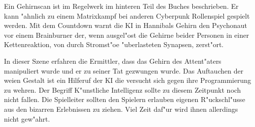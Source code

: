 \begin{remarks}
	Ein Gehirnscan ist im Regelwerk im hinteren Teil des Buches beschrieben. Er kann "ahnlich zu einem Matrixkampf bei anderen Cyberpunk Rollenspiel gespielt werden. Mit dem Countdown warnt die KI in Hannibals Gehirn den Psychonaut vor einem Brainburner der, wenn ausgel"ost die Gehirne beider Personen in einer Kettenreaktion, von durch Stromst"o\3e "uberlasteten Synapsen, zerst"ort.

	In dieser Szene erfahren die Ermittler, dass das Gehirn des Attent"aters manipuliert wurde und er zu seiner Tat gezwungen wurde. Das Auftauchen der wei\3en Gestalt ist ein Hilferuf der KI die versucht sich gegen ihre Programmierung zu wehren. Der Begriff K"unstliche Intelligenz sollte zu diesem Zeitpunkt noch nicht fallen. Die Spielleiter sollten den Spielern erlauben eigenen R"uckschl"usse aus den bizarren Erlebnissen zu ziehen. Viel Zeit daf"ur wird ihnen allerdings nicht gew"ahrt.
\end{remarks}

